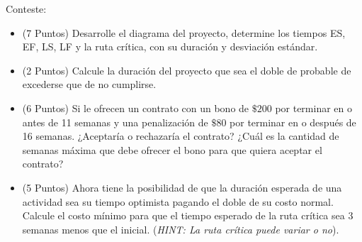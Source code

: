 \documentclass[11pt, a4paper]{article}
\begin{document}
  Conteste:
  \begin{itemize}
    \item[\textbf{i.}] (7 Puntos) Desarrolle el diagrama del proyecto, determine los tiempos ES, EF, LS, LF y la ruta crítica, con su duración y desviación estándar.
    \item[\textbf{ii.}] (2 Puntos) Calcule la duración del proyecto que sea el doble de probable de excederse que de no cumplirse.
    \item[\textbf{iii.}] (6 Puntos) Si le ofrecen un contrato con un bono de $\$200$ por terminar en o antes de 11 semanas y una penalización de $\$80$ por terminar en o después de 16 semanas. ¿Aceptaría o rechazaría el contrato? ¿Cuál es la cantidad de semanas máxima que debe ofrecer el bono para que quiera aceptar el contrato?
    \item[\textbf{iv.}] (5 Puntos) Ahora tiene la posibilidad de que la duración esperada de una actividad sea su tiempo optimista pagando el doble de su costo normal. Calcule el costo mínimo para que el tiempo esperado de la ruta crítica sea 3 semanas menos que el inicial. (\textit{HINT: La ruta crítica puede variar o no}).
  \end{itemize}
\end{document}
